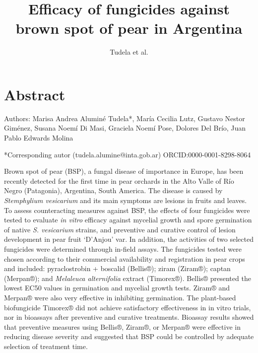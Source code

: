\documentclass[
  letterpaper,
  DIV=11,
  numbers=noendperiod]{scrreport}
\title{Efficacy of fungicides against brown spot of pear in Argentina}
\author{Tudela et al.}
\date{}
\renewcommand*\contentsname{Table of contents}
\newcommand\contentsname{Table of contents}
\begin{document}
\maketitle
\ifdefined\Shaded\renewenvironment{Shaded}{\begin{tcolorbox}[interior hidden, borderline west={3pt}{0pt}{shadecolor}, enhanced, frame hidden, sharp corners, boxrule=0pt, breakable]}{\end{tcolorbox}}\fi

\renewcommand*\contentsname{Table of contents}
{
\hypersetup{linkcolor=}
\setcounter{tocdepth}{2}
\tableofcontents
}

\hypertarget{abstract}{%
\chapter*{Abstract}\label{abstract}}


Authors: Marisa Andrea Aluminé Tudela*, María Cecilia Lutz, Gustavo
Nestor Giménez, Susana Noemí Di Masi, Graciela Noemí Pose, Dolores Del
Brío, Juan Pablo Edwards Molina

*Corresponding autor (tudela.alumine@inta.gob.ar)
ORCID:0000-0001-8298-8064

Brown spot of pear (BSP), a fungal disease of importance in Europe, has
been recently detected for the first time in pear orchards in the Alto
Valle of Río Negro (Patagonia), Argentina, South America. The disease is
caused by \emph{Stemphylium vesicarium} and its main symptoms are
lesions in fruits and leaves. To assess counteracting measures against
BSP, the effects of four fungicides were tested to evaluate \emph{in
vitro} efficacy against mycelial growth and spore germination of native
\emph{S. vesicarium} strains, and preventive and curative control of
lesion development in pear fruit `D'Anjou' var. In addition, the
activities of two selected fungicides were determined through in-field
assays. The fungicides tested were chosen according to their commercial
availability and registration in pear crops and included: pyraclostrobin
+ boscalid (Bellis®); ziram (Ziram®); captan (Merpan®); and
\emph{Melaleuca alternifolia} extract (Timorex®). Bellis® presented the
lowest EC50 values in germination and mycelial growth tests. Ziram® and
Merpan® were also very effective in inhibiting germination. The
plant-based biofungicide Timorex® did not achieve satisfactory
effectiveness in in vitro trials, nor in bioassays after preventive and
curative treatments. Bioassay results showed that preventive measures
using Bellis®, Ziram®, or Merpan® were effective in reducing disease
severity and suggested that BSP could be controlled by adequate
selection of treatment time.
\end{document}
